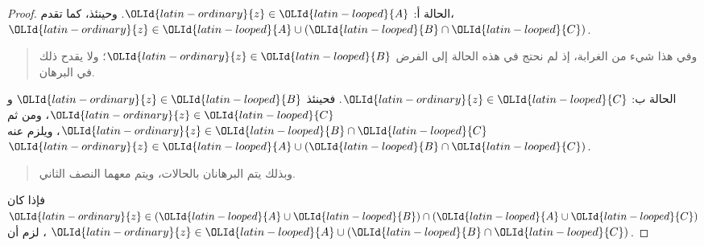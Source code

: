 \documentclass[../../../include/open-logic-section]{subfiles}
\begin{document}
\begin{proof}
الحالة أ: ${\OLId{latin-ordinary}{z}} \in {\OLId{latin-looped}{A}}$. وحينئذ، كما تقدم،
${\OLId{latin-ordinary}{z}} \in {\OLId{latin-looped}{A}} \cup ({\OLId{latin-looped}{B}} \cap {\OLId{latin-looped}{C}})$.
\begin{quote}
وفي هذا شيء من الغرابة، إذ لم نحتج في هذه الحالة إلى الفرض
${\OLId{latin-ordinary}{z}} \in {\OLId{latin-looped}{B}}$؛ ولا يقدح ذلك في البرهان.
\end{quote}
الحالة ب: ${\OLId{latin-ordinary}{z}} \in {\OLId{latin-looped}{C}}$. فحينئذ ${\OLId{latin-ordinary}{z}} \in {\OLId{latin-looped}{B}}$ و${\OLId{latin-ordinary}{z}} \in {\OLId{latin-looped}{C}}$، ومن ثم
${\OLId{latin-ordinary}{z}} \in {\OLId{latin-looped}{B}} \cap {\OLId{latin-looped}{C}}$، ويلزم عنه ${\OLId{latin-ordinary}{z}} \in {\OLId{latin-looped}{A}} \cup ({\OLId{latin-looped}{B}} \cap {\OLId{latin-looped}{C}})$.
\begin{quote}
وبذلك يتم البرهانان بالحالات، ويتم معهما النصف الثاني.
\end{quote}
فإذا كان ${\OLId{latin-ordinary}{z}} \in ({\OLId{latin-looped}{A}} \cup {\OLId{latin-looped}{B}}) \cap ({\OLId{latin-looped}{A}} \cup {\OLId{latin-looped}{C}})$، لزم أن
${\OLId{latin-ordinary}{z}} \in {\OLId{latin-looped}{A}} \cup ({\OLId{latin-looped}{B}} \cap {\OLId{latin-looped}{C}})$.
\end{proof}
\end{document}
